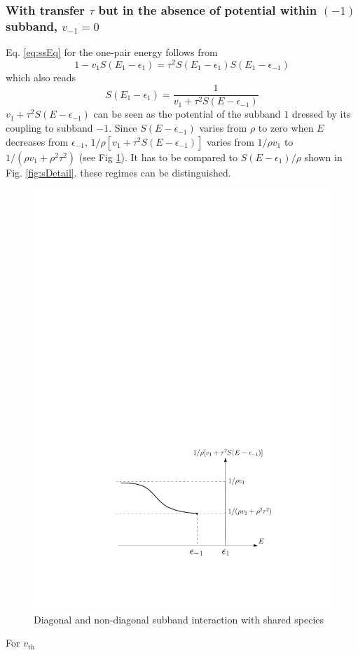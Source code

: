 \documentclass[11pt]{article} %
\begin{document}
\subsubsection{With transfer $\tau$ but in the absence of potential within $(-1)$ subband, $v_{-1}=0$}
Eq.  \ref{eq:ssEq} for the one-pair energy follows from 
\begin{equation}
1-v_{1}S(E_1-\epsilon_{1})
=\tau^2S(E_1-\epsilon_{1})S(E_1-\epsilon_{-1})
\end{equation}
which also reads
\begin{equation}
S(E_1-\epsilon_{1})=\frac{1}{v_{1}+\tau^{2}S(E-\epsilon_{-1})}
\end{equation}
${v_{1}+\tau^{2}S(E-\epsilon_{-1})}$ can be seen as the potential of the subband $1$ dressed by its coupling to subband $-1$.  Since $S(E-\epsilon_{-1})$ varies from $\rho$ to zero when $E$ decreases from $\epsilon_{-1}$, ${1}/{\rho{}[v_{1}+\tau^{2}S(E-\epsilon_{-1})]}$ varies from $1/\rho{}v_{1}$ to $1/(\rho{}v_{1}+\rho^{2}\tau^{2})$ (see Fig \ref{fig:1rhov}). It has to be compared to $S(E-\epsilon_{1})/\rho$ shown in Fig. \ref{fig:sDetail}.  these regimes can be distinguished.  
\begin{figure}[htb]
	\centering
	       \includegraphics[width=.6\textwidth]{1rhov}
			\caption{Diagonal and non-diagonal subband interaction with shared species \label{fig:1rhov}}
\end{figure}

For $v_{\text{th}}$
















\end{document}
